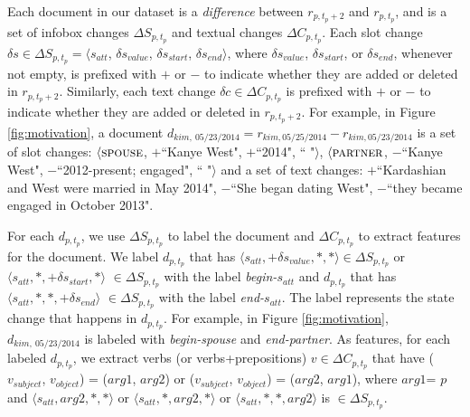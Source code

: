 Each document in our dataset is a \textit{difference} between $r_{p, t_p+2}$ and $r_{p, t_p}$, and is a set of infobox changes $\Delta S_{p, t_p}$ and textual changes $\Delta C_{p, t_p}$. Each slot change $\delta s \in \Delta S_{p, t_p} = \langle s_{att}$, $\delta s_{value}$,  $\delta s_{start}$, $\delta s_{end} \rangle$, where $\delta s_{value}$,  $\delta s_{start}$, or $\delta s_{end}$, whenever not empty, is prefixed with $+$ or $-$ to indicate whether they are added or deleted in $r_{p, t_p+2}$. Similarly, each text change $\delta c \in \Delta C_{p, t_p}$ is prefixed with $+$ or $-$ to indicate whether they are added or deleted in $r_{p, t_p+2}$. For example, in Figure \ref{fig:motivation}, a document $d_{kim,\ 05/23/2014} = r_{kim, 05/25/2014} - r_{kim, 05/23/2014}$ is a set of slot changes: $\langle\textsc{spouse}$, \textbf{$+$}\footnotesize ``Kanye West"\normalsize,  $+$\footnotesize ``2014"\normalsize, \footnotesize`` "\normalsize$\rangle$, $\langle\textsc{partner}$, $-$\footnotesize``Kanye West"\normalsize,  $-$\footnotesize``2012-present; engaged"\normalsize, \footnotesize`` "\normalsize$\rangle$ and a set of text changes: $+$\footnotesize``Kardashian and West were married in May 2014"\normalsize, $-$\footnotesize``She began dating West"\normalsize, $-$\footnotesize``they became engaged in October 2013"\normalsize.

For each $d_{p, t_p}$, we use $\Delta S_{p, t_p}$ to label the document and $\Delta C_{p, t_p}$ to extract features for the document. We label $d_{p, t_p}$ that has $\langle s_{att}, +\delta s_{value}, *, *\rangle \in \Delta S_{p, t_p}$ or $\langle s_{att}, *, +\delta s_{start}, *\rangle$ $\in \Delta S_{p, t_p}$ with the label \textit{begin-}$s_{att}$ and $d_{p, t_p}$ that has $\langle s_{att}, *, *, +\delta s_{end}\rangle$ $\in \Delta S_{p, t_p}$ with the label \textit{end-}$s_{att}$. The label represents the state change that happens in $d_{p, t_p}$. For example, in Figure \ref{fig:motivation}, $d_{kim,\ 05/23/2014}$ is labeled with \textit{begin-spouse} and \textit{end-partner}. As features, for each labeled $d_{p,t_p}$, we extract verbs (or verbs+prepositions) $v \in \Delta C_{p, t_p}$ that have ($v_{subject}$, $v_{object}$) = (\scriptsize$arg1$\normalsize, \scriptsize$arg2$\normalsize) or ($v_{subject}$, $v_{object}$) = (\scriptsize$arg2$\normalsize,  \scriptsize$arg1$\normalsize), where \scriptsize$arg1$\normalsize = $p$ and $\langle s_{att}, $\scriptsize$arg2$\normalsize$, *, *\rangle$ or $\langle s_{att}, *, $\scriptsize$arg2$\normalsize$, *\rangle$ or $\langle s_{att}, *, *, $\scriptsize$arg2$\normalsize$\rangle$ is $\in \Delta S_{p, t_p}$.

